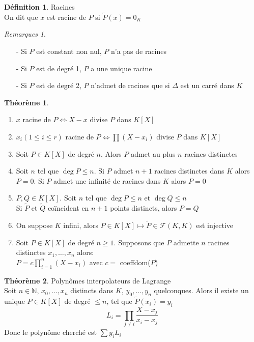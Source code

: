 \documentclass[fleqn]{article}
\theoremstyle{definition} \newtheorem*{defi}{D\'efinition}
\theoremstyle{definition} \newtheorem*{theo}{Th\'eor\`eme}
\theoremstyle{definition} \newtheorem*{coro}{Corollaire}
\theoremstyle{definition} \newtheorem*{nota}{Notation}
\theoremstyle{remark} \newtheorem*{rqs}{Remarques}
\theoremstyle{definition} \newtheorem*{prop}{Propri\'et\'e}
\begin{document}
\begin{defi} Racines \\
	On dit que $x$ est racine de $P$ si $\tilde{P}(x) = 0_K$
	\begin{rqs} $ $
		\begin{itemize}
			\item [-] Si $P$ est constant non nul, $P$ n'a pas de racines
			\item [-] Si $P$ est de degr\'e 1, $P$ a une unique racine
			\item [-] Si $P$ est de degr\'e 2, $P$ n'admet de racines que si $\Delta$ est un carr\'e dans $K$
		\end{itemize}
	\end{rqs}
\end{defi}

\begin{theo} $ $
	\begin{enumerate}
		\item $x$ racine de $P \Leftrightarrow X - x$ divise $P$ dans $K[X]$
		\item $x_i (1 \leq i \leq r)$ racine de $P \Leftrightarrow \prod (X - x_i)$ divise $P$ dans $K[X]$
		\item Soit $P \in K[X]$ de degr\'e $n$. Alors $P$ admet au plus $n$ racines distinctes
		\item Soit $n$ tel que $\deg P \leq n$. Si $P$ admet $n+1$ racines distinctes dans $K$ alors $P = 0$.
			Si $P$ admet une infinit\'e de racines dans $K$ alors $P = 0$
		\item $P,Q \in K[X]$. Soit $n$ tel que $\deg P \leq n$ et $\deg Q \leq n$ \\
			Si $\tilde{P}$ et $\tilde{Q}$ co\"incident en $n+1$ points distincts, alors $P=Q$
		\item On suppose $K$ infini, alors $P \in K[X] \mapsto \tilde{P} \in \mathcal{F}(K,K)$ est injective
		\item Soit $P \in K[X]$ de degr\'e $n \geq 1$. Supposons que $P$ admette $n$ racines distinctes $x_1, \hdots, x_n$ alors: \\
			$P = c\prod_{i=1}^n(X-x_i)$ avec $c = $ coeffdom($P$)
	\end{enumerate}
\end{theo}

\begin{theo} Polyn\^omes interpolateurs de Lagrange \\
	Soit $n\in \mathbb{N}$, $x_0, \hdots, x_n$ distincts dans $K$, $y_0, \hdots, y_n$ quelconques. Alors il existe un unique $P \in K[X]$
	de degr\'e $\leq n$, tel que $\tilde{P}(x_i) = y_i$
	\[L_i =\prod_{j\neq i} \frac{X-x_j}{x_i - x_j}\]
	Donc le polyn\^ome cherch\'e est $\sum y_i L_i$
\end{theo}
\end{document}
